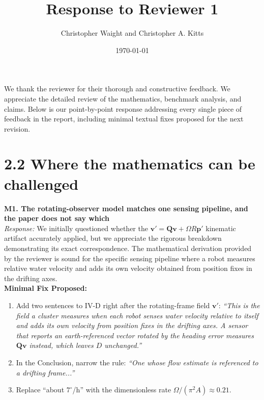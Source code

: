 \documentclass[10pt]{article}
\begin{document}
\title{\vspace{-2.0cm}Response to Reviewer 1}
\author{Christopher Waight and Christopher A. Kitts}
\date{\today}
\maketitle

\vspace{-0.5cm}
We thank the reviewer for their thorough and constructive feedback. We appreciate the detailed review of the mathematics, benchmark analysis, and claims. Below is our point-by-point response addressing every single piece of feedback in the report, including minimal textual fixes proposed for the next revision.

\vspace{-0.2cm}
\section*{2.2 Where the mathematics can be challenged}

\textbf{M1. The rotating-observer model matches one sensing pipeline, and the paper does not say which} \\
\textit{Response:} We initially questioned whether the $\mathbf{v}' = \mathbf{Q}\mathbf{v} + \Omega R \mathbf{p}'$ kinematic artifact accurately applied, but we appreciate the rigorous breakdown demonstrating its exact correspondence. The mathematical derivation provided by the reviewer is sound for the specific sensing pipeline where a robot measures relative water velocity and adds its own velocity obtained from position fixes in the drifting axes. \\
\textbf{Minimal Fix Proposed:} 
\begin{enumerate}
    \setlength{\itemsep}{0pt}
    \setlength{\parskip}{0pt}
    \item Add two sentences to IV-D right after the rotating-frame field $\mathbf{v}'$: \textit{``This is the field a cluster measures when each robot senses water velocity relative to itself and adds its own velocity from position fixes in the drifting axes. A sensor that reports an earth-referenced vector rotated by the heading error measures $\mathbf{Q}\mathbf{v}$ instead, which leaves $D$ unchanged.''}
    \item In the Conclusion, narrow the rule: \textit{``One whose flow estimate is referenced to a drifting frame...''}
    \item Replace ``about $7^\circ$/h'' with the dimensionless rate $\Omega/(\pi^2 A) \approx 0.21$.
\end{enumerate}
\end{document}
